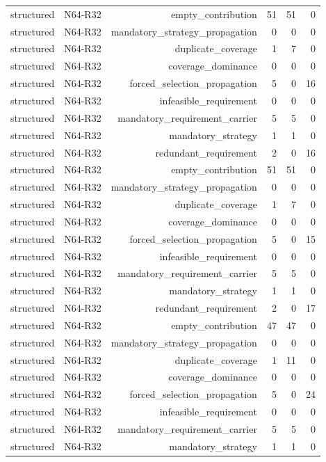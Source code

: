 {\begin{longtable}{lrrrrr}
structured & N64-R32 & empty\_contribution & 51 & 51 & 0 \\
structured & N64-R32 & mandatory\_strategy\_propagation & 0 & 0 & 0 \\
structured & N64-R32 & duplicate\_coverage & 1 & 7 & 0 \\
structured & N64-R32 & coverage\_dominance & 0 & 0 & 0 \\
structured & N64-R32 & forced\_selection\_propagation & 5 & 0 & 16 \\
structured & N64-R32 & infeasible\_requirement & 0 & 0 & 0 \\
structured & N64-R32 & mandatory\_requirement\_carrier & 5 & 5 & 0 \\
structured & N64-R32 & mandatory\_strategy & 1 & 1 & 0 \\
structured & N64-R32 & redundant\_requirement & 2 & 0 & 16 \\
structured & N64-R32 & empty\_contribution & 51 & 51 & 0 \\
structured & N64-R32 & mandatory\_strategy\_propagation & 0 & 0 & 0 \\
structured & N64-R32 & duplicate\_coverage & 1 & 7 & 0 \\
structured & N64-R32 & coverage\_dominance & 0 & 0 & 0 \\
structured & N64-R32 & forced\_selection\_propagation & 5 & 0 & 15 \\
structured & N64-R32 & infeasible\_requirement & 0 & 0 & 0 \\
structured & N64-R32 & mandatory\_requirement\_carrier & 5 & 5 & 0 \\
structured & N64-R32 & mandatory\_strategy & 1 & 1 & 0 \\
structured & N64-R32 & redundant\_requirement & 2 & 0 & 17 \\
structured & N64-R32 & empty\_contribution & 47 & 47 & 0 \\
structured & N64-R32 & mandatory\_strategy\_propagation & 0 & 0 & 0 \\
structured & N64-R32 & duplicate\_coverage & 1 & 11 & 0 \\
structured & N64-R32 & coverage\_dominance & 0 & 0 & 0 \\
structured & N64-R32 & forced\_selection\_propagation & 5 & 0 & 24 \\
structured & N64-R32 & infeasible\_requirement & 0 & 0 & 0 \\
structured & N64-R32 & mandatory\_requirement\_carrier & 5 & 5 & 0 \\
structured & N64-R32 & mandatory\_strategy & 1 & 1 & 0 \\

\end{longtable}}
